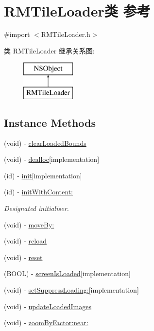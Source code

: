\hypertarget{interface_r_m_tile_loader}{\section{R\-M\-Tile\-Loader类 参考}
\label{interface_r_m_tile_loader}
}


{\ttfamily \#import $<$R\-M\-Tile\-Loader.\-h$>$}

类 R\-M\-Tile\-Loader 继承关系图\-:\begin{figure}[H]
\begin{center}
\leavevmode
\includegraphics[height=2.000000cm]{interface_r_m_tile_loader}
\end{center}
\end{figure}
\subsection*{Instance Methods}
\begin{DoxyCompactItemize}
\item 
(void) -\/ \hyperlink{interface_r_m_tile_loader_a8e4e2f252f22b31c93405217973bb23e}{clear\-Loaded\-Bounds}
\item 
(void) -\/ \hyperlink{interface_r_m_tile_loader_af26f3ef09cbb40b42966ee4d9d51b70f}{dealloc}{\ttfamily  \mbox{[}implementation\mbox{]}}
\item 
(id) -\/ \hyperlink{interface_r_m_tile_loader_ae73f660c88ceccefe692b7a357553fcf}{init}{\ttfamily  \mbox{[}implementation\mbox{]}}
\item 
(id) -\/ \hyperlink{interface_r_m_tile_loader_aeca249f0baab8e2602fa2a7f32eb9cf7}{init\-With\-Content\-:}
\begin{DoxyCompactList}\small\item\em Designated initialiser. \end{DoxyCompactList}\item 
(void) -\/ \hyperlink{interface_r_m_tile_loader_a82306905799fd3d0b727929da3f86cc5}{move\-By\-:}
\item 
(void) -\/ \hyperlink{interface_r_m_tile_loader_a814fd7676d653b3afde5430053b03308}{reload}
\item 
(void) -\/ \hyperlink{interface_r_m_tile_loader_a9aafa2e0654e75cd584165b506f40e15}{reset}
\item 
(B\-O\-O\-L) -\/ \hyperlink{interface_r_m_tile_loader_af6718f00229bc4e407d81e249dc38d9d}{screen\-Is\-Loaded}{\ttfamily  \mbox{[}implementation\mbox{]}}
\item 
(void) -\/ \hyperlink{interface_r_m_tile_loader_aca7724c7960c2c015f7f47f49deaaa55}{set\-Suppress\-Loading\-:}{\ttfamily  \mbox{[}implementation\mbox{]}}
\item 
(void) -\/ \hyperlink{interface_r_m_tile_loader_a228550af511b4824f829ced899c27188}{update\-Loaded\-Images}
\item 
(void) -\/ \hyperlink{interface_r_m_tile_loader_a53a37459285c76a2ad068c7e14767b98}{zoom\-By\-Factor\-:near\-:}
\end{DoxyCompactItemize}
